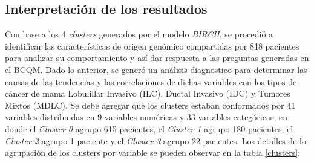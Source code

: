 \subsection{Interpretación de los resultados}
Con base a los 4 \textit{clusters} generados por el modelo \textit{BIRCH}, se procedió a identificar las características de origen genómico compartidas por 818 pacientes para analizar su comportamiento y así dar respuesta a las preguntas generadas en el BCQM. Dado lo anterior, se generó un análisis diagnostico para determinar las causas de las tendencias y las correlaciones de dichas variables con los tipos de cáncer de mama Lobulillar Invasivo (ILC), Ductal Invasivo (IDC) y Tumores Mixtos (MDLC). Se debe agregar que los clusters estaban conformados por 41 variables distribuidas en 9 variables numéricas y 33 variables categóricas, en donde el \textit{Cluster 0} agrupo 615 pacientes, el \textit{Cluster 1} agrupo 180 pacientes, el \textit{Cluster 2} agrupo 1 paciente y el \textit{Cluster 3} agrupo 22 pacientes. Los detalles de lo agrupación de los clusters por variable se pueden observar en la tabla \ref{clusters}:
